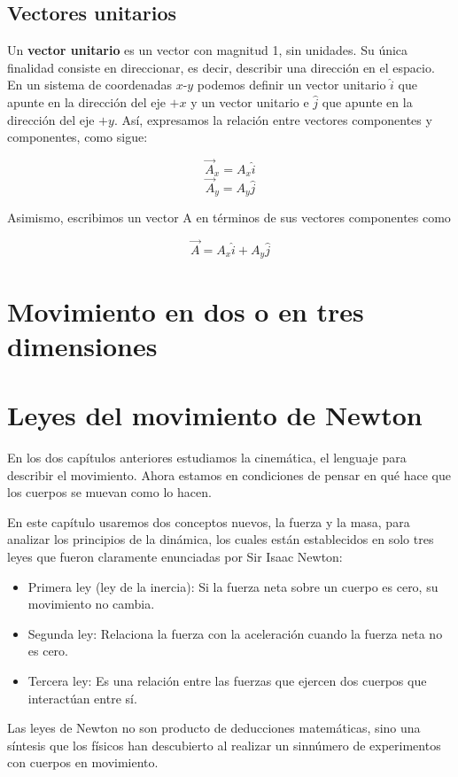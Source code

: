 \documentclass{article}
\newcommand{\newsection}[1]{
    \vspace{0.5cm}
    {\color{sectionColor}
    \centering
    \section{\bl{#1}}}
    \color{black}
    \vspace{0.5cm}
}
\newcommand{\newsubsection}[1]{
    \vspace{0.5cm}
    \color{sectionColor}
    \subsection{ #1}
    \color{black}
    \vspace{0.5cm}
}
\newcommand{\bl}[1]{\textbf{#1}}
\begin{document}
    \newsubsection{Vectores unitarios}

    \par Un \bl{vector unitario} es un vector con magnitud 1, sin unidades. Su única ﬁnalidad consiste en direccionar, es decir, describir una dirección en el espacio. En un sistema de coordenadas $x$-$y$ podemos deﬁnir un vector unitario $\hat{i}$ que apunte en la dirección del eje $+x$ y un vector unitario e $\hat{j}$ que apunte en la dirección del eje $+y$. Así, expresamos la relación entre vectores componentes y componentes, como sigue:

    \[ \vec{A}_x = A_x \hat{i} \]
    \[ \vec{A}_y = A_y \hat{j} \]

    Asimismo, escribimos un vector A en términos de sus vectores componentes como

    \[ \vec{A} = A_x \hat{i} + A_y \hat{j} \]

\newsection{Movimiento en dos o en tres dimensiones}


\newsection{Leyes del movimiento de Newton}

\par En los dos capítulos anteriores estudiamos la cinemática, el lenguaje para describir el movimiento. Ahora estamos en condiciones de pensar en qué hace que los cuerpos se muevan como lo hacen.

\par En este capítulo usaremos dos conceptos nuevos, la fuerza y la masa, para analizar los principios de la dinámica, los cuales están establecidos en solo tres leyes que fueron claramente enunciadas por Sir Isaac Newton:

\begin{itemize}
    \item Primera ley (ley de la inercia): Si la fuerza neta sobre un cuerpo es cero, su movimiento no cambia.
    \item Segunda ley: Relaciona la fuerza con la aceleración cuando la fuerza neta no es cero.
    \item Tercera ley: Es una relación entre las fuerzas que ejercen dos cuerpos que interactúan entre sí.
\end{itemize}

\par Las leyes de Newton no son producto de deducciones matemáticas, sino una síntesis que los físicos han descubierto al realizar un sinnúmero de experimentos con cuerpos en movimiento.
\end{document}
